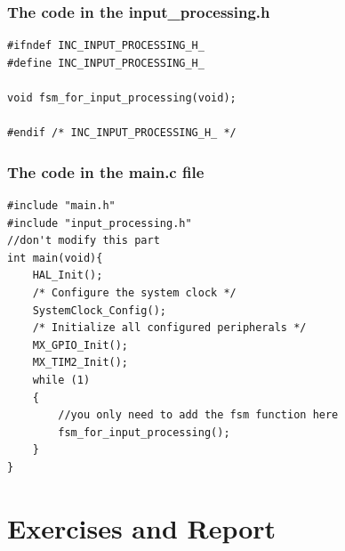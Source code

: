 \subsubsection{The code in the input\_processing.h}
\begin{lstlisting}[caption=Code in the input\_processing.h file]
#ifndef INC_INPUT_PROCESSING_H_
#define INC_INPUT_PROCESSING_H_

void fsm_for_input_processing(void);

#endif /* INC_INPUT_PROCESSING_H_ */
\end{lstlisting}


\subsubsection{The code in the main.c file}
\begin{lstlisting}[caption=The code in the main.c file]
#include "main.h"
#include "input_processing.h"
//don't modify this part
int main(void){
    HAL_Init();
    /* Configure the system clock */
    SystemClock_Config();
    /* Initialize all configured peripherals */
    MX_GPIO_Init();
    MX_TIM2_Init();
    while (1)
    {
        //you only need to add the fsm function here
        fsm_for_input_processing();
    }
}
\end{lstlisting}

\newpage
\section{Exercises and Report}
